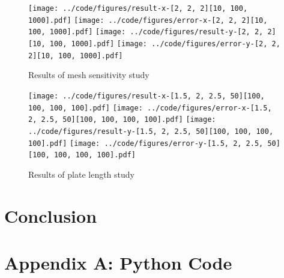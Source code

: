 \documentclass[twocolumn,10pt]{asme2ej}
\begin{document}
\begin{figure}[tb]
\begin{center}
\texttt{[image: ../code/figures/result-x-[2, 2, 2][10, 100, 1000].pdf]}
\texttt{[image: ../code/figures/error-x-[2, 2, 2][10, 100, 1000].pdf]}
\texttt{[image: ../code/figures/result-y-[2, 2, 2][10, 100, 1000].pdf]}
\texttt{[image: ../code/figures/error-y-[2, 2, 2][10, 100, 1000].pdf]}
\caption{Results of mesh sensitivity study}
\label{sensitivity_study}
\end{center}
\end{figure}
\begin{figure}[tb]
\begin{center}
\texttt{[image: ../code/figures/result-x-[1.5, 2, 2.5, 50][100, 100, 100, 100].pdf]}
\texttt{[image: ../code/figures/error-x-[1.5, 2, 2.5, 50][100, 100, 100, 100].pdf]}
\texttt{[image: ../code/figures/result-y-[1.5, 2, 2.5, 50][100, 100, 100, 100].pdf]}
\texttt{[image: ../code/figures/error-y-[1.5, 2, 2.5, 50][100, 100, 100, 100].pdf]}
\caption{Results of plate length study}
\label{length_study}
\end{center}
\end{figure}


\section{Conclusion}




\clearpage
\onecolumn
\appendix       %
\section*{Appendix A: Python Code}



\end{document}
